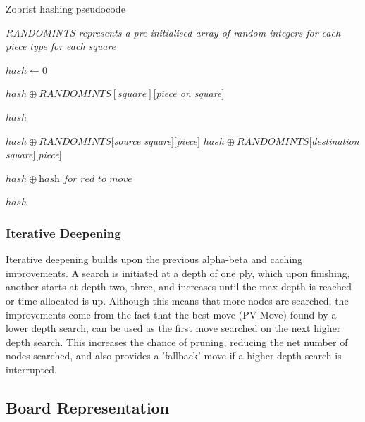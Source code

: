 \documentclass[../main/main.tex]{subfiles}
\begin{document}
\begin{algorithm}[H]
\caption{Zobrist hashing pseudocode}
\begin{algorithmic}
    \item \textit{RANDOMINTS represents a pre-initialised array of random integers for each piece type for each square}

    \bigskip

        \State $hash \gets 0$

                \State $hash \oplus RANDOMINTS[square][$\textit{piece on square}$]$
            \EndIf
        \EndFor

        \State \Return $hash$
    \EndFunction

    \bigskip

        \State $hash \oplus RANDOMINTS[$\textit{source square}$][$\textit{piece}$]$
        \State $hash \oplus RANDOMINTS[$\textit{destination square}$][$\textit{piece}$]$

            \State $hash \oplus \textit{hash for red to move}$ 
        \EndIf

        \State \Return $hash$
    \EndFunction
\end{algorithmic}
\end{algorithm}

\subsubsection*{Iterative Deepening}
\label{sec:design-deepening}
Iterative deepening builds upon the previous alpha-beta and caching improvements. A search is initiated at a depth of one ply, which upon finishing, another starts at depth two, three, and increases until the max depth is reached or time allocated is up. Although this means that more nodes are searched, the improvements come from the fact that the best move (PV-Move) found by a lower depth search, can be used as the first move searched on the next higher depth search. This increases the chance of pruning, reducing the net number of nodes searched, and also provides a 'fallback' move if a higher depth search is interrupted.

\subsection{Board Representation}
\end{document}

